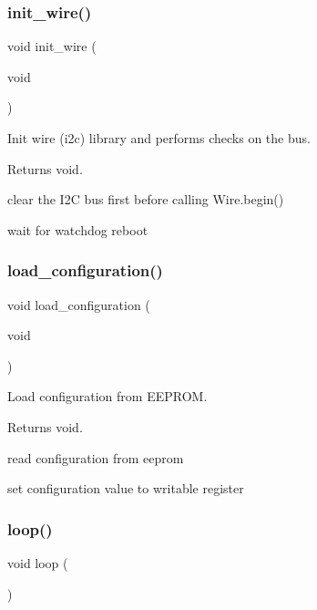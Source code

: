 \subsubsection{\texorpdfstring{init\+\_\+wire()}{init\_wire()}}
{\footnotesize\ttfamily void init\+\_\+wire (\begin{DoxyParamCaption}\item[{void}]{ }\end{DoxyParamCaption})}



Init wire (i2c) library and performs checks on the bus. 

\begin{DoxyReturn}{Returns}
void. 
\end{DoxyReturn}
clear the I2C bus first before calling Wire.\+begin()

wait for watchdog reboot \mbox{\label{i2c-rain_8ino_a32a64a2800c724fb28e10636f2ec20b9}} 
\subsubsection{\texorpdfstring{load\+\_\+configuration()}{load\_configuration()}}
{\footnotesize\ttfamily void load\+\_\+configuration (\begin{DoxyParamCaption}\item[{void}]{ }\end{DoxyParamCaption})}



Load configuration from E\+E\+P\+R\+OM. 

\begin{DoxyReturn}{Returns}
void. 
\end{DoxyReturn}
read configuration from eeprom

set configuration value to writable register \mbox{\label{i2c-rain_8ino_afe461d27b9c48d5921c00d521181f12f}} 
\subsubsection{\texorpdfstring{loop()}{loop()}}
{\footnotesize\ttfamily void loop (\begin{DoxyParamCaption}{ }\end{DoxyParamCaption})}



